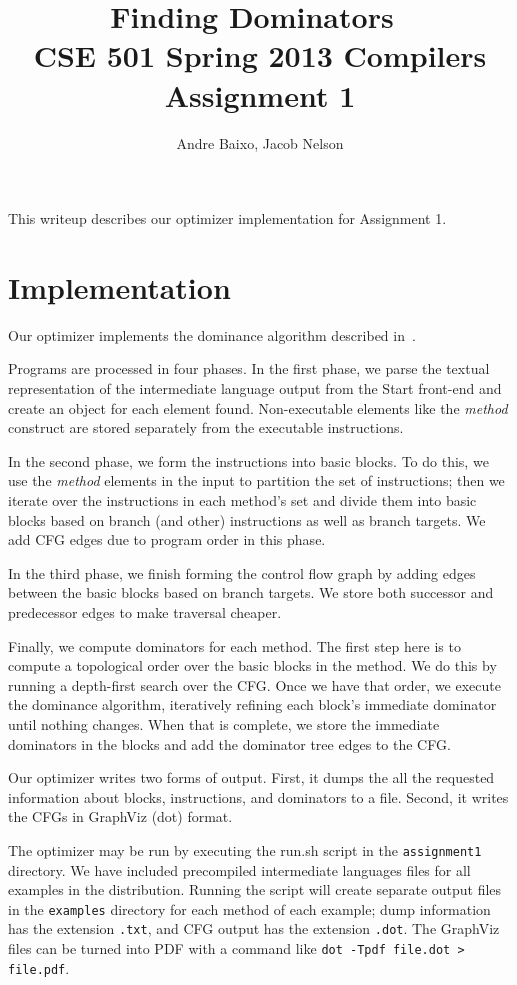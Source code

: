 \documentclass[10pt,twocolumn]{article}
\begin{document}
\title{Finding Dominators\ \\
  \small CSE 501 Spring 2013 Compilers Assignment 1}
\author{Andre Baixo, Jacob Nelson}
\maketitle

This writeup describes our optimizer implementation for Assignment 1.

\section{Implementation}

Our optimizer implements the dominance algorithm described in~\cite{Cooper_asimple}. 

Programs are processed in four phases. In the first phase, we parse
the textual representation of the intermediate language output from
the Start front-end and create an object for each element
found. Non-executable elements like the {\it method} construct are
stored separately from the executable instructions.

In the second phase, we form the instructions into basic blocks. To do
this, we use the {\it method} elements in the input to partition the
set of instructions; then we iterate over the instructions in each
method's set and divide them into basic blocks based on branch (and
other) instructions as well as branch targets. We add CFG edges due to
program order in this phase.

In the third phase, we finish forming the control flow graph by adding
edges between the basic blocks based on branch targets. We store both
successor and predecessor edges to make traversal cheaper. 

Finally, we compute dominators for each method. The first step here is
to compute a topological order over the basic blocks in the method. We
do this by running a depth-first search over the CFG. Once we have
that order, we execute the dominance algorithm, iteratively refining
each block's immediate dominator until nothing changes. When that is
complete, we store the immediate dominators in the blocks and add the
dominator tree edges to the CFG.

Our optimizer writes two forms of output. First, it dumps the all the
requested information about blocks, instructions, and dominators to a
file. Second, it writes the CFGs in GraphViz (dot) format.

The optimizer may be run by executing the run.sh script in the
\texttt{assignment1} directory. We have included precompiled
intermediate languages files for all examples in the
distribution. Running the script will create separate output files in
the \texttt{examples} directory for each method of each example; dump
information has the extension \texttt{.txt}, and CFG output has the
extension \texttt{.dot}. The GraphViz files can be turned into PDF
with a command like \texttt{dot -Tpdf file.dot > file.pdf}.
\end{document}
